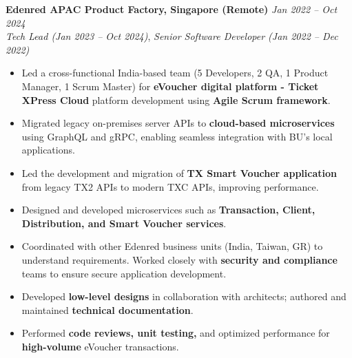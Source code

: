 \documentclass[12pt,a4paper]{article}
\begin{document}
\textbf{Edenred APAC Product Factory, Singapore (Remote)} \hfill \textit{Jan 2022 -- Oct 2024}\\
\textit{Tech Lead (Jan 2023 -- Oct 2024)},
\newline
\textit{Senior Software Developer (Jan 2022 -- Dec 2022)}
\begin{itemize}
    \item Led a cross-functional India-based team (5 Developers, 2 QA, 1 Product Manager, 1 Scrum Master) for \textbf{eVoucher digital platform - Ticket XPress Cloud} platform development using \textbf{Agile Scrum framework}.
    \item Migrated legacy on-premises server APIs to \textbf{cloud-based microservices} using GraphQL and gRPC, enabling seamless integration with BU's local applications.
    \item Led the development and migration of \textbf{TX Smart Voucher application} from legacy TX2 APIs to modern TXC APIs, improving performance.
    \item Designed and developed microservices such as \textbf{Transaction, Client, Distribution, and Smart Voucher services}.
    \item Coordinated with other Edenred business units (India, Taiwan, GR) to understand requirements. Worked closely with \textbf{security and compliance} teams to ensure secure application development.
    \item Developed \textbf{low-level designs} in collaboration with architects; authored and maintained \textbf{technical documentation}.
    \item Performed \textbf{code reviews, unit testing,} and optimized performance for \textbf{high-volume} eVoucher transactions.
\end{itemize}
\end{document}

